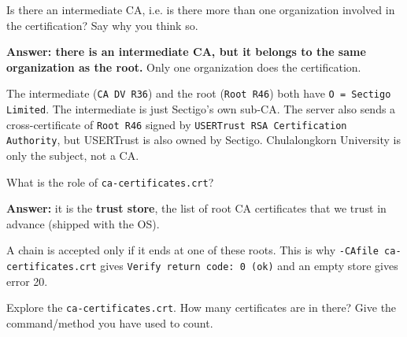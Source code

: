 \documentclass[a4paper, 10pt]{article}
\begin{document}
\newpage

\begin{problem}
	Is there an intermediate CA, i.e. is there more than one organization involved in the certification?
	Say why you think so.
\end{problem}

\begin{solution}
	\noindent \textbf{Answer: there is an intermediate CA, but it belongs to the same organization as the root.}
	Only one organization does the certification.

	The intermediate (\texttt{CA DV R36}) and the root (\texttt{Root R46}) both have \texttt{O = Sectigo Limited}.
	The intermediate is just Sectigo's own sub-CA.
	The server also sends a cross-certificate of \texttt{Root R46} signed by \texttt{USERTrust RSA Certification Authority}, but USERTrust is also owned by Sectigo.
	Chulalongkorn University is only the subject, not a CA.
\end{solution}

\begin{problem}
	What is the role of \texttt{ca-certificates.crt}?
\end{problem}

\begin{solution}
	\noindent \textbf{Answer:} it is the \textbf{trust store}, the list of root CA certificates that we trust in advance (shipped with the OS).

	A chain is accepted only if it ends at one of these roots.
	This is why \texttt{-CAfile ca-certificates.crt} gives \texttt{Verify return code: 0 (ok)} and an empty store gives error 20.
\end{solution}

\begin{problem}
	Explore the \texttt{ca-certificates.crt}.
	How many certificates are in there?
	Give the command/method you have used to count.
\end{problem}
\end{document}
